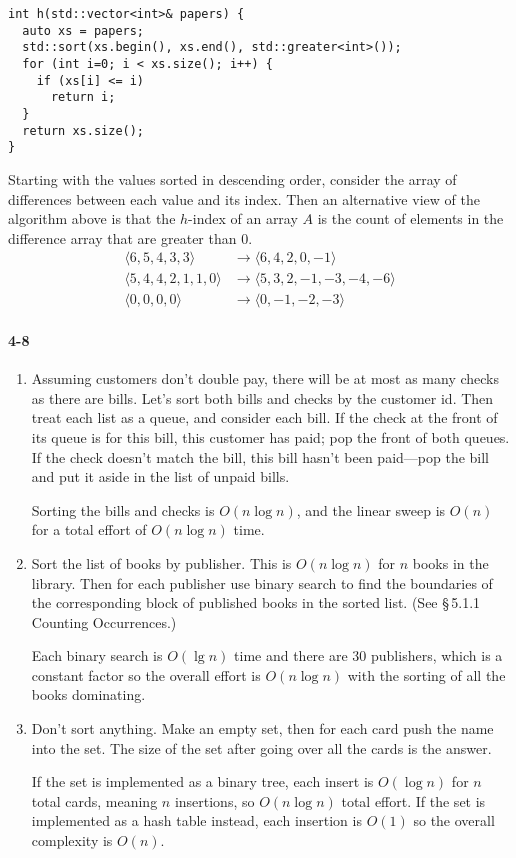 \documentclass{report}
\begin{document}
\begin{lstlisting}
int h(std::vector<int>& papers) {
  auto xs = papers;
  std::sort(xs.begin(), xs.end(), std::greater<int>());
  for (int i=0; i < xs.size(); i++) {
    if (xs[i] <= i)
      return i;
  }
  return xs.size();
}
\end{lstlisting}

Starting with the values sorted in descending order, consider the array of differences between each value and its index. Then an alternative view of the algorithm above is that the $h$-index of an array $A$ is the count of elements in the difference array that are greater than 0.
\begin{align*}
	\langle 6,5,4,3,3 \rangle &\rightarrow \langle 6,4,2,0,-1 \rangle \\
	\langle 5,4,4,2,1,1,0 \rangle &\rightarrow \langle 5,3,2,-1,-3,-4,-6 \rangle \\
	\langle 0,0,0,0 \rangle &\rightarrow \langle 0,-1,-2,-3 \rangle
\end{align*}

\paragraph{4-8}
\begin{enumerate}[label=(\alph*)]
	\item Assuming customers don't double pay, there will be at most as many checks as there are bills. Let's sort both bills and checks by the customer id. Then treat each list as a queue, and consider each bill. If the check at the front of its queue is for this bill, this customer has paid; pop the front of both queues. If the check doesn't match the bill, this bill hasn't been paid---pop the bill and put it aside in the list of unpaid bills.

	Sorting the bills and checks is $O(n\log n)$, and the linear sweep is $O(n)$ for a total effort of $O(n\log n)$ time.

	\item Sort the list of books by publisher. This is $O(n\log n)$ for $n$ books in the library. Then for each publisher use binary search to find the boundaries of the corresponding block of published books in the sorted list. (See \S\,5.1.1 Counting Occurrences.)

	Each binary search is $O(\lg n)$ time and there are 30 publishers, which is a constant factor so the overall effort is $O(n\log n)$ with the sorting of all the books dominating.

	\item Don't sort anything. Make an empty set, then for each card push the name into the set. The size of the set after going over all the cards is the answer.

	If the set is implemented as a binary tree, each insert is $O(\log n)$ for $n$ total cards, meaning $n$ insertions, so $O(n\log n)$ total effort. If the set is implemented as a hash table instead, each insertion is $O(1)$ so the overall complexity is $O(n)$.
\end{enumerate}
\end{document}
